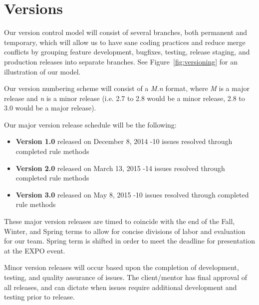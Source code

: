 \documentclass[11pt]{scrreprt}
\begin{document}
\section{Versions}

Our version control model will consist of several branches, both permanent and temporary, which will allow us to have sane coding practices and reduce merge conflicts by grouping feature development, bugfixes, testing, release staging, and production releases into separate branches. See Figure~\ref{fig:versioning} for an illustration of our model.

Our version numbering scheme will consist of a \textit{M.n} format, where \textit{M} is a major release and \textit{n} is a minor release (i.e. 2.7 to 2.8 would be a minor release, 2.8 to 3.0 would be a major release).

Our major version release schedule will be the following:
\begin{itemize}
	\item \textbf{Version 1.0} released on December 8, 2014
	-10 issues resolved through completed rule methods
	\item \textbf{Version 2.0} released on March 13, 2015
	-14 issues resolved through completed rule methods
	\item \textbf{Version 3.0} released on May 8, 2015
	-10 issues resolved through completed rule methods
\end{itemize}

These major version releases are timed to coincide with the end of the Fall, Winter, and Spring terms to allow for concise divisions of labor and evaluation for our team. Spring term is shifted in order to meet the deadline for presentation at the EXPO event.

Minor version releases will occur based upon the completion of development, testing, and quality assurance of issues. The client/mentor has final approval of all releases, and can dictate when issues require additional development and testing prior to release.
\end{document}
